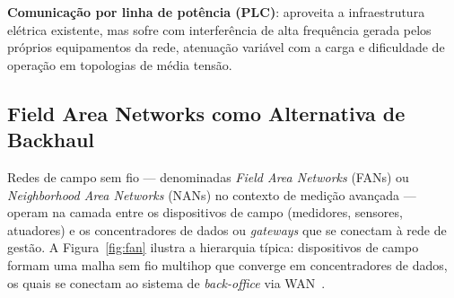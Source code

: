 \documentclass[conference]{IEEEtran}
\begin{document}
\textbf{Comunicação por linha de potência (PLC)}: aproveita a infraestrutura
elétrica existente, mas sofre com interferência de alta frequência gerada pelos
próprios equipamentos da rede, atenuação variável com a carga e dificuldade de
operação em topologias de média tensão.

\subsection{Field Area Networks como Alternativa de Backhaul}

Redes de campo sem fio --- denominadas \textit{Field Area Networks} (FANs) ou
\textit{Neighborhood Area Networks} (NANs) no contexto de medição avançada --- operam na
camada entre os dispositivos de campo (medidores, sensores, atuadores) e os
concentradores de dados ou \textit{gateways} que se conectam à rede de gestão. A
Figura~\ref{fig:fan} ilustra a hierarquia típica: dispositivos de campo formam
uma malha sem fio multihop que converge em concentradores de dados, os quais se
conectam ao sistema de \textit{back-office} via WAN~\cite{ancillotti2013rpl}.
\end{document}
